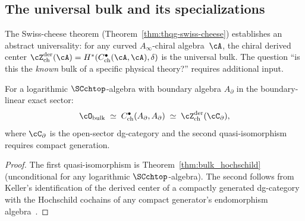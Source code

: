 %

\subsection{The universal bulk and its specializations}
\label{subsec:universal-bulk-specializations}

The Swiss-cheese theorem
(Theorem~\ref{thm:thqg-swiss-cheese})
establishes an abstract universality: for any curved
$A_\infty$-chiral algebra~$\cA$, the chiral derived center
$\cZ^{\mathrm{der}}_{\mathrm{ch}}(\cA)
= H^*(C^\bullet_{\mathrm{ch}}(\cA, \cA), \delta)$
is the universal bulk.  The question ``is this the \emph{known}
bulk of a specific physical theory?'' requires additional input.

\begin{proposition}
\label{prop:bulk-specialization-boundary-linear}
For a logarithmic $\SCchtop$-algebra with boundary algebra
$A_\partial$ in the boundary-linear exact sector:
\[
  \cO_{\mathrm{bulk}}
  \;\simeq\;
  C^\bullet_{\mathrm{ch}}(A_\partial, A_\partial)
  \;\simeq\;
  \cZ^{\mathrm{der}}_{\mathrm{ch}}(\cC_\partial),
\]
where $\cC_\partial$ is the open-sector dg-category and the
second quasi-isomorphism requires compact generation.
\end{proposition}

\begin{proof}
The first quasi-isomorphism is
Theorem~\ref{thm:bulk_hochschild} (unconditional for any
logarithmic $\SCchtop$-algebra).  The second follows from
Keller's identification of the derived center of a compactly
generated dg-category with the Hochschild cochains of any compact
generator's endomorphism algebra~\cite{Kel06}.
\end{proof}

